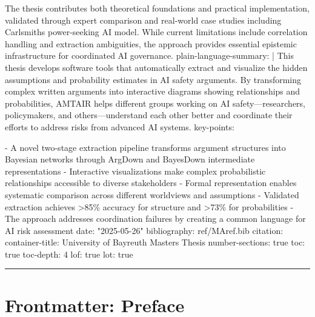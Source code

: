 \documentclass[
  11pt,
  letterpaper,
]{book}
\newenvironment{Shaded}{\begin{snugshade}}{\end{snugshade}}
\newcommand{\NormalTok}[1]{\textcolor[rgb]{0.00,0.23,0.31}{#1}}
\newcommand{\SpecialStringTok}[1]{\textcolor[rgb]{0.13,0.47,0.30}{#1}}
\begin{document}
\begin{Shaded}
\begin{Highlighting}[]
\NormalTok{The thesis contributes both theoretical foundations and practical implementation, validated through expert comparison and real{-}world case studies including Carlsmith\textquotesingle{}s power{-}seeking AI model. While current limitations include correlation handling and extraction ambiguities, the approach provides essential epistemic infrastructure for coordinated AI governance. plain{-}language{-}summary: | This thesis develops software tools that automatically extract and visualize the hidden assumptions and probability estimates in AI safety arguments. By transforming complex written arguments into interactive diagrams showing relationships and probabilities, AMTAIR helps different groups working on AI safety—researchers, policymakers, and others—understand each other better and coordinate their efforts to address risks from advanced AI systems. key{-}points:}

\SpecialStringTok{{-} }\NormalTok{A novel two{-}stage extraction pipeline transforms argument structures into Bayesian networks through ArgDown and BayesDown intermediate representations}
\SpecialStringTok{{-} }\NormalTok{Interactive visualizations make complex probabilistic relationships accessible to diverse stakeholders}
\SpecialStringTok{{-} }\NormalTok{Formal representation enables systematic comparison across different worldviews and assumptions}
\SpecialStringTok{{-} }\NormalTok{Validated extraction achieves \textgreater{}85\% accuracy for structure and \textgreater{}73\% for probabilities}
\SpecialStringTok{{-} }\NormalTok{The approach addresses coordination failures by creating a common language for AI risk assessment date: "2025{-}05{-}26" bibliography: ref/MAref.bib citation: container{-}title: University of Bayreuth Master\textquotesingle{}s Thesis number{-}sections: true toc: true toc{-}depth: 4 lof: true lot: true}
\end{Highlighting}
\end{Shaded}

\begin{center}\rule{0.5\linewidth}{0.5pt}\end{center}


\chapter*{Frontmatter: Preface}\label{frontmatter-preface}

\end{document}
